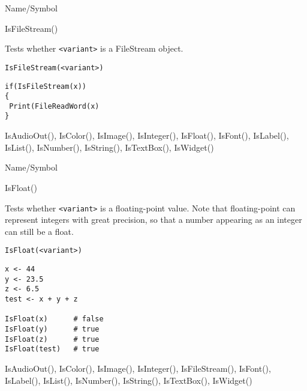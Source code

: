 \rl




\begin{desc}{Name/Symbol}
\item[Name/Symbol]	IsFileStream()

\item[Description]	Tests whether \verb+<variant>+ is a FileStream object.

\item[Usage]		
\begin{verbatim}
IsFileStream(<variant>)
\end{verbatim}

\item[Example]
\begin{verbatim}
if(IsFileStream(x))
{
 Print(FileReadWord(x)
}
\end{verbatim}

\item[See Also]	IsAudioOut(), IsColor(), IsImage(), IsInteger(), 
            	IsFloat(), IsFont(), IsLabel(), IsList(), IsNumber(), 
		IsString(), IsTextBox(), IsWidget()
\end{desc}

\rl




\begin{desc}{Name/Symbol}
\item[Name/Symbol]	IsFloat()

\item[Description]	Tests whether \verb+<variant>+ is a floating-point value. Note
	that floating-point can represent integers with great 
	precision, so that a number appearing as an integer 
	can still be a float.

\item[Usage]
\begin{verbatim}
IsFloat(<variant>)
\end{verbatim}

\item[Example]
\begin{verbatim}
x <- 44
y <- 23.5
z <- 6.5
test <- x + y + z 

IsFloat(x)     	# false
IsFloat(y)     	# true
IsFloat(z)     	# true
IsFloat(test)  	# true
\end{verbatim}

\item[See Also]	IsAudioOut(), IsColor(), IsImage(), IsInteger(), 
		IsFileStream(), IsFont(), IsLabel(), IsList(), 
		IsNumber(), IsString(), IsTextBox(), IsWidget()
\end{desc}

